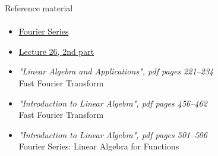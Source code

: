 \documentclass[aspectratio=169]{beamer}
\newcommand{\fbckg}[1]{\usebackgroundtemplate{\texttt{[image: \#1]}}}%
\begin{document}
\begin{frame}[t]{Reference material}
    \framesubtitle{}
    \Large
    \begin{itemize}
        \item \href{https://youtu.be/vA9dfINW4Rg}{Fourier Series}
        \item \href{https://www.youtube.com/watch?v=M0Sa8fLOajA&list=PL49CF3715CB9EF31D&index=27}{Lecture 26, 2nd part}
        \item \textit{"Linear Algebra and Applications", pdf pages 221--234 }\\ Fast Fourier Transform
        \item \textit{"Introduction to Linear Algebra", pdf pages 456--462 }\\ Fast Fourier Transform
        \item  \textit{"Introduction to Linear Algebra", pdf pages 501--506 }\\ Fourier Series:  Linear Algebra for Functions 
    \end{itemize}
\end{frame}

\fbckg{fibeamer/figs/last_page.png}
\frame[plain]{}
\end{document}
